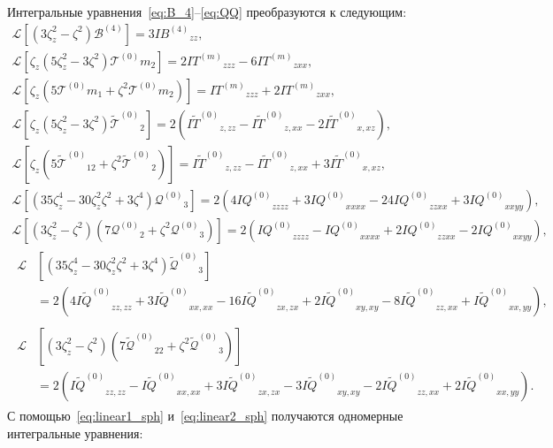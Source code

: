 \documentclass[a4paper,12pt]{article}
\newcommand{\B}{\ensuremath{\mathcal{B}^{(4)}}}
\newcommand{\Q}{\ensuremath{\mathcal{Q}^{(0)}}}
\newcommand{\T}[1][0]{\ensuremath{\mathcal{T}^{(#1)}}}
\newcommand{\TT}{\ensuremath{\tilde{\mathcal{T}}^{(0)}}}
\newcommand{\QQ}{\ensuremath{\tilde{\mathcal{Q}}^{(0)}}}
\newcommand{\IF}[2][0]{\ensuremath{I{#2}^{(#1)}}}
\newcommand{\IFF}[1]{\ensuremath{I\tilde{#1}^{(0)}}}
\begin{document}
Интегральные уравнения~\eqref{eq:B_4}--\eqref{eq:QQ} преобразуются к следующим:
\begin{gather}
    \mathcal{L}\left[\left(3\zeta_z^2 - \zeta^2\right)\B\right]
        = 3\IF[4]{B}_{zz}, \\[6pt]
    \mathcal{L}\left[\zeta_z\left(5\zeta_z^2 - 3\zeta^2\right)\T{m}_2\right]
        = 2\IF[m]{T}_{zzz} - 6\IF[m]{T}_{zxx}, \\
    \mathcal{L}\left[\zeta_z\left(5\T{m}_1 + \zeta^2\T{m}_2\right)\right]
        = \IF[m]{T}_{zzz} + 2\IF[m]{T}_{zxx}, \\[6pt]
    \mathcal{L}\left[\zeta_z\left(5\zeta_z^2 - 3\zeta^2\right)\TT_2\right]
        = 2\left(\IFF{T}_{z,zz} - \IFF{T}_{z,xx} - 2\IFF{T}_{x,xz}\right), \\
    \mathcal{L}\left[\zeta_z\left(5\TT_{12} + \zeta^2\TT_2\right)\right]
        = \IFF{T}_{z,zz} - \IFF{T}_{z,xx} + 3\IFF{T}_{x,xz}, \\[6pt]
    \mathcal{L}\left[\left(35\zeta_z^4 - 30\zeta_z^2\zeta^2 + 3\zeta^4\right)\Q_3\right]
        = 2\left( 4\IF{Q}_{zzzz} + 3\IF{Q}_{xxxx} - 24\IF{Q}_{zzxx} + 3\IF{Q}_{xxyy} \right), \\
    \mathcal{L}\left[\left(3\zeta_z^2 - \zeta^2\right)\left(7\Q_2 + \zeta^2\Q_3\right)\right]
        = 2\left( \IF{Q}_{zzzz} - \IF{Q}_{xxxx} + 2\IF{Q}_{zzxx} - 2\IF{Q}_{xxyy} \right), \\[6pt]
    \begin{aligned}
    \mathcal{L}&\left[\left(35\zeta_z^4 - 30\zeta_z^2\zeta^2 + 3\zeta^4\right)\QQ_3\right] \\
        &= 2\left( 4\IFF{Q}_{zz,zz} + 3\IFF{Q}_{xx,xx} - 16\IFF{Q}_{zx,zx} + 2\IFF{Q}_{xy,xy} - 8\IFF{Q}_{zz,xx} + \IFF{Q}_{xx,yy} \right),
    \end{aligned}\\
    \begin{aligned}
    \mathcal{L}&\left[\left(3\zeta_z^2 - \zeta^2\right)\left(7\QQ_{22} + \zeta^2\QQ_3\right)\right] \\
        &= 2\left( \IFF{Q}_{zz,zz} - \IFF{Q}_{xx,xx} + 3\IFF{Q}_{zx,zx} - 3\IFF{Q}_{xy,xy} - 2\IFF{Q}_{zz,xx} + 2\IFF{Q}_{xx,yy} \right).
    \end{aligned}
\end{gather}
С помощью~\eqref{eq:linear1_sph} и~\eqref{eq:linear2_sph} получаются одномерные интегральные уравнения:
\end{document}
